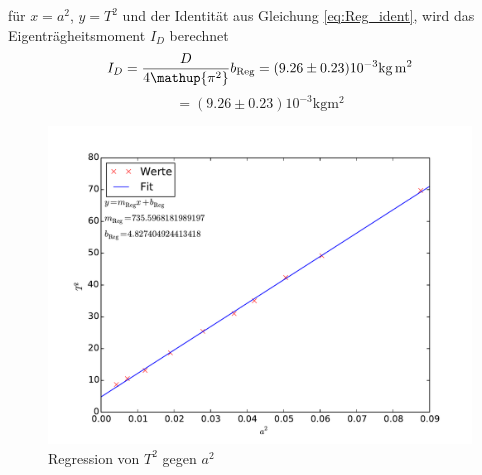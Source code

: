 für $x=a^2$, $y=T^2$ und der Identität aus Gleichung \eqref{eq:Reg_ident}, wird das Eigenträgheitsmoment $I_D$ berechnet
\begin{equation*}
	I_D= \frac{D}{4\mathup{\pi^2}}b_{\text{Reg}}\\
	   = (9.26\pm0.23)10^{-3} \si{\kilo\gram\meter\squared}
\end{equation*}
\begin{equation}
	= (9.26\pm0.23)10^{-3} \si{\kilo\gram\meter\squared}
\end{equation}
\begin{figure}[hp]
	\centering
	\label{fig:Regress}
	\includegraphics[width=\textwidth]{Bilder/Messung2.pdf}
	\caption{Regression von $T^2$ gegen $a^2$}
\end{figure}
\newpage
